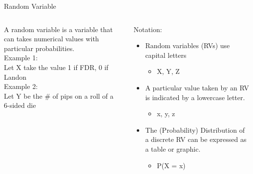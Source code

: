 \documentclass[aspectratio=169]{../latex_main/tntbeamer}  %
\begin{document}
	
	\begin{frame}{Random Variable}
	    \begin{columns}
	        \begin{column}{.4\textwidth}
	                A random variable is a variable that can takes numerical values with particular probabilities.\\
	                \bigskip
	                Example 1:\\
                    Let X take the value 1 if FDR, 0 if \\
                    Landon\\
                    \bigskip
                    Example 2:\\
                    Let Y be the \# of pips on a roll of a \\
                    6-sided die



	        \end{column}
	        
	        
	        \begin{column}{.4\textwidth}
	            Notation:
	                \begin{itemize}
	                    \item Random variables (RVs) use capital letters
	                    \begin{itemize}
	                        \item X, Y, Z
	                    \end{itemize}
	                    \item A particular value taken by an RV is indicated by a lowercase letter.
	                    \begin{itemize}
	                        \item x, y, z
	                    \end{itemize}
	                    \item The (Probability) Distribution of a discrete RV can be expressed as a table or graphic.
	                    \begin{itemize}
	                        \item P(X = x)
	                    \end{itemize}
	                \end{itemize}
	        \end{column}
	    \end{columns}
	\end{frame}
	
\end{document}
